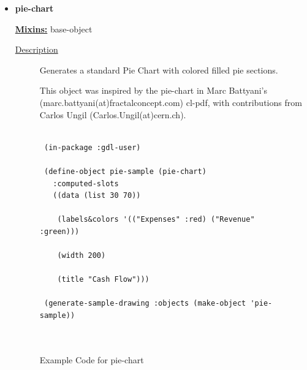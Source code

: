 \documentclass [11pt]{book}
\begin{document}
\begin{itemize}
\item {}
\label{prim:pie-chart}
\textbf{pie-chart}


\textbf{
\underline{Mixins:}} base-object





\begin{description}

\item [
\underline{Description}]


Generates a standard Pie Chart with colored filled pie sections.

This object was inspired by the pie-chart in Marc Battyani's (marc.battyani(at)fractalconcept.com)
cl-pdf, with contributions from Carlos Ungil (Carlos.Ungil(at)cern.ch).



\end{description}




\begin{figure}
\begin{lrbox}{\boxedverb}
\begin{minipage}{\linewidth}
{\small

\begin{verbatim}

 (in-package :gdl-user)
 
 (define-object pie-sample (pie-chart)
   :computed-slots
   ((data (list 30 70))
   
    (labels&colors '(("Expenses" :red) ("Revenue" :green)))
   
    (width 200) 
   
    (title "Cash Flow")))

 (generate-sample-drawing :objects (make-object 'pie-sample))

 
\end{verbatim}}
\end{minipage}
\end{lrbox}
\fbox{\usebox{\boxedverb}}

\caption{Example Code for pie-chart}

\label{fig:example-code-pie-chart}

\end{figure}


\end{itemize}
\end{document}
